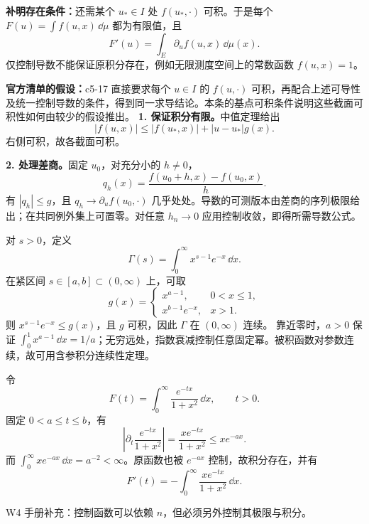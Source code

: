 \textbf{补明存在条件：}还需某个 $u_*\in I$ 处 $f(u_*,\cdot)$ 可积。于是每个 $F(u)=\int f(u,x)\,\dd\mu$ 都为有限值，且
\[
F'(u)=\int_E\partial_u f(u,x)\,\dd\mu(x).
\]
仅控制导数不能保证原积分存在，例如无限测度空间上的常数函数 $f(u,x)=1$。

\textbf{官方清单的假设：}c5-17 直接要求每个 $u\in I$ 的 $f(u,\cdot)$ 可积，再配合上述可导性及统一控制导数的条件，得到同一求导结论。本条的基点可积条件说明这些截面可积性如何由较少的假设推出。
\textbf{1. 保证积分有限。}中值定理给出
\[
|f(u,x)|\le|f(u_*,x)|+|u-u_*|g(x).
\]
右侧可积，故各截面可积。

\textbf{2. 处理差商。}固定 $u_0$，对充分小的 $h\ne0$，
\[
q_h(x)=\frac{f(u_0+h,x)-f(u_0,x)}h.
\]
有 $|q_h|\le g$，且 $q_h\to\partial_u f(u_0,\cdot)$ 几乎处处。导数的可测版本由差商的序列极限给出；在共同例外集上可置零。对任意 $h_n\to0$ 应用控制收敛，即得所需导数公式。

对 $s>0$，定义
\[
\Gamma(s)=\int_0^\infty x^{s-1}e^{-x}\,\dd x.
\]
在紧区间 $s\in[a,b]\subset(0,\infty)$ 上，可取
\[
g(x)=
\begin{cases}
x^{a-1},&0<x\le1,\\
x^{b-1}e^{-x},&x>1.
\end{cases}
\]
则 $x^{s-1}e^{-x}\le g(x)$，且 $g$ 可积，因此 $\Gamma$ 在 $(0,\infty)$ 连续。
靠近零时，$a>0$ 保证 $\int_0^1x^{a-1}\,\dd x=1/a$；无穷远处，指数衰减控制任意固定幂。被积函数对参数连续，故可用含参积分连续性定理。

令
\[
F(t)=\int_0^\infty\frac{e^{-tx}}{1+x^2}\,\dd x,\qquad t>0.
\]
固定 $0<a\le t\le b$，有
\[
\left|\partial_t\frac{e^{-tx}}{1+x^2}\right|
=\frac{xe^{-tx}}{1+x^2}\le xe^{-ax}.
\]
而 $\int_0^\infty xe^{-ax}\,\dd x=a^{-2}<\infty$。原函数也被 $e^{-ax}$ 控制，故积分存在，并有
\[
F'(t)=-\int_0^\infty\frac{xe^{-tx}}{1+x^2}\,\dd x.
\]

W4 手册补充：控制函数可以依赖 $n$，但必须另外控制其极限与积分。

